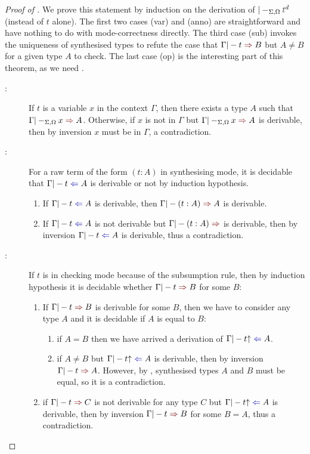 \begin{proof}[Proof of {}]
  We prove this statement by induction on the derivation of $|-_{\Sigma, \Omega} \isTerm{t}^{d}$ (instead of $t$ alone).
  The first two cases (var) and (anno) are straightforward and have nothing to do with mode-correctness directly.
  The third case (sub) invokes the uniqueness of synthesised types to refute the case that $\Gamma |- t \syn B$ but $A \neq B$ for a given type $A$ to check.
  The last case (op) is the interesting part of this theorem, as we need .
  \begin{description}
    \item[:] If $t$ is a variable $x$ in the context $\Gamma$, then there exists a type $A$ such that $\Gamma |-_{\Sigma, \Omega} x \syn A$.
      Otherwise, if $x$ is not in $\Gamma$ but $\Gamma |-_{\Sigma, \Omega} x \syn A$ is derivable, then by inversion $x$ must be in $\Gamma$, a contradiction.
    \item[:] For a raw term of the form $(t : A)$ in synthesising mode, it is decidable that $\Gamma |- t \chk A$ is derivable or not by induction hypothesis.
      \begin{enumerate}
        \item If $\Gamma |- t \chk A$ is derivable, then $\Gamma |- (t : A) \syn A$ is derivable.
        \item If $\Gamma |- t \chk A$ is not derivable but $\Gamma |- (t : A) \syn$ is derivable, then by inversion $\Gamma |- t \chk A$ is derivable, thus a contradiction.
      \end{enumerate}
      
    \item[:] If $t$ is in checking mode because of the subsumption rule, then by induction hypothesis it is decidable whether $\Gamma |- t \syn B$ for some $B$:
      \begin{enumerate}
        \item If $\Gamma |- t \syn B$ is derivable for some $B$, then we have to consider any type $A$ and it is decidable if $A$ is equal to $B$:
          \begin{enumerate}
            \item if $A = B$ then we have arrived a derivation of $\Gamma |- t\subsum \chk A$.
            \item if $A \neq B$ but $\Gamma |- t \subsum \chk A$ is derivable, then by inversion $\Gamma |- t \syn A$.
              However, by , synthesised types $A$ and $B$ must be equal, so it is a contradiction.
          \end{enumerate}
        \item if $\Gamma |- t \syn C$ is not derivable for any type $C$ but $\Gamma |- t\subsum \chk A$ is derivable, then by inversion $\Gamma |- t \syn B$ for some $B = A$, thus a contradiction.
      \end{enumerate}
      

\end{description}
\end{proof}
